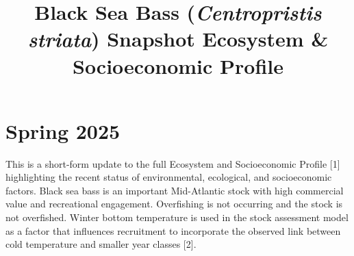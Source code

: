 \documentclass[
  10pt,
  letterpaper,
  DIV=11,
  numbers=noendperiod]{scrartcl}
\title{Black Sea Bass (\protect\textit{Centropristis striata})
\linebreak Snapshot Ecosystem \& Socioeconomic Profile}
\author{}
\date{}
\begin{document}
\maketitle

\BgThispage

\vspace{-2.5cm}
\section{Spring 2025}

This is a short-form update to the full Ecosystem and Socioeconomic
Profile {[}1{]} highlighting the recent status of environmental,
ecological, and socioeconomic factors. Black sea bass is an important
Mid-Atlantic stock with high commercial value and recreational
engagement. Overfishing is not occurring and the stock is not
overfished. Winter bottom temperature is used in the stock assessment
model as a factor that influences recruitment to incorporate the
observed link between cold temperature and smaller year classes {[}2{]}.
\end{document}

